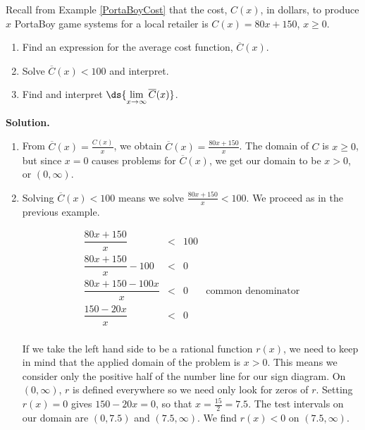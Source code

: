 \documentclass{ximera}
\begin{document}
\begin{example} \label{averagecostapp} Recall from Example \ref {PortaBoyCost} that the cost,  $C(x)$, in dollars, to produce $x$ PortaBoy game systems for a local retailer is $C(x) = 80x + 150$, $x \geq 0$.

\begin{enumerate}

\item  Find an expression for the average cost function, $\overline{C}(x)$. 

\item  \label{costlessthan} Solve $\overline{C}(x) < 100$ and interpret.

\item  Find and interpret $\ds{\lim_{x \rightarrow \infty} \overline{C}(x)}$.


\end{enumerate}

{\bf Solution.}

\begin{enumerate}

\item  From $\overline{C}(x) = \frac{C(x)}{x}$, we obtain $\overline{C}(x) = \frac{80x+150}{x}$.  The domain of $C$ is $x \geq 0$, but since $x=0$ causes problems for $\overline{C}(x)$, we get our domain to be $x>0$, or $(0, \infty)$.

\item  Solving $\overline{C}(x) < 100$ means we solve $\frac{80x+150}{x} < 100$.  We proceed as in the previous example.

\[ \begin{array}{rclr}

\dfrac{80x+150}{x} & < & 100 & \\ [10pt]

\dfrac{80x+150}{x} - 100 & < & 0 & \\ [10pt]

\dfrac{80x + 150 - 100x}{x} & < & 0 & \text{common denominator} \\ [10pt]

\dfrac{150 - 20x}{x} & < & 0 & \\

\end{array} \]

If we take the left hand side to be a rational function $r(x)$, we need to keep in mind that the applied domain of the problem is $x > 0$.  This means we consider only the positive half of the number line for our sign diagram.  On $(0, \infty)$, $r$ is defined everywhere so we need only look for zeros of $r$.  Setting $r(x)=0$ gives $150-20x =0$, so that $x = \frac{15}{2}= 7.5$.  The test intervals on our domain are $(0, 7.5)$ and $(7.5, \infty)$.  We find $r(x) < 0$ on $(7.5, \infty)$.  


\end{enumerate}
\end{example}
\end{document}
